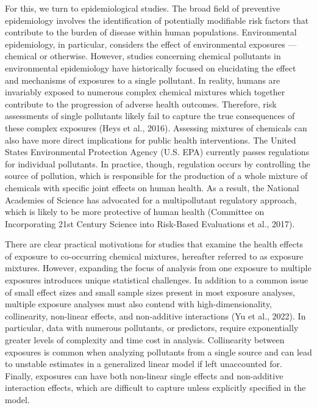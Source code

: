 \documentclass[12pt, twoside]{amherstthesis}
\begin{document}
For this, we turn to epidemiological studies. The broad field of preventive epidemiology involves the identification of potentially modifiable risk factors that contribute to the burden of disease within human populations. Environmental epidemiology, in particular, considers the effect of environmental exposures --- chemical or otherwise. However, studies concerning chemical pollutants in environmental epidemiology have historically focused on elucidating the effect and mechanisms of exposures to a single pollutant. In reality, humans are invariably exposed to numerous complex chemical mixtures which together contribute to the progression of adverse health outcomes. Therefore, risk assessments of single pollutants likely fail to capture the true consequences of these complex exposures (Heys et al., 2016). Assessing mixtures of chemicals can also have more direct implications for public health interventions. The United States Environmental Protection Agency (U.S. EPA) currently passes regulations for individual pollutants. In practice, though, regulation occurs by controlling the source of pollution, which is responsible for the production of a whole mixture of chemicals with specific joint effects on human health. As a result, the National Academies of Science has advocated for a multipollutant regulatory approach, which is likely to be more protective of human health (Committee on Incorporating 21st Century Science into Risk-Based Evaluations et al., 2017).

There are clear practical motivations for studies that examine the health effects of exposure to co-occurring chemical mixtures, hereafter referred to as exposure mixtures. However, expanding the focus of analysis from one exposure to multiple exposures introduces unique statistical challenges. In addition to a common issue of small effect sizes and small sample sizes present in most exposure analyses, multiple exposure analyses must also contend with high-dimensionality, collinearity, non-linear effects, and non-additive interactions (Yu et al., 2022). In particular, data with numerous pollutants, or predictors, require exponentially greater levels of complexity and time cost in analysis. Collinearity between exposures is common when analyzing pollutants from a single source and can lead to unstable estimates in a generalized linear model if left unaccounted for. Finally, exposures can have both non-linear single effects and non-additive interaction effects, which are difficult to capture unless explicitly specified in the model.
\end{document}
